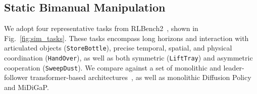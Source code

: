\documentclass[letterpaper, 10 pt, journal, twoside]{IEEEtran}
\renewcommand{\figref}[1]{Fig.~\ref{#1}}
\begin{document}
%
%
%

\subsection{Static Bimanual Manipulation}\label{sec:exp_bi}
%
%
%
%
We adopt four representative tasks from RLBench2~\cite{grotz2024peract2}, shown in \figref{fig:sim_tasks}.
These tasks encompass long horizons and interaction with articulated objects (\texttt{StoreBottle}), precise temporal, spatial, and physical coordination (\texttt{HandOver}), as well as both symmetric (\texttt{LiftTray}) and asymmetric cooperation (\texttt{SweepDust}).
We compare against a set of monolithic and leader-follower transformer-based architectures~\cite{grotz2024peract2, zhao2023learning}, as well as monolithic Diffusion Policy and MiDiGaP.
\end{document}
